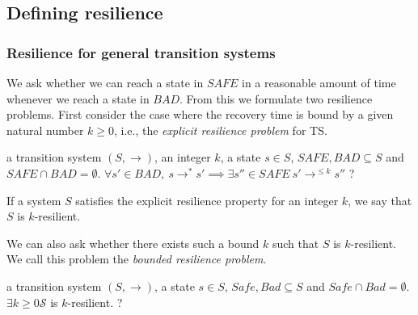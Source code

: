 
\iffalse
\subsection{Defining resilience}


\subsubsection{Resilience for general transition systems}


We ask whether we can reach a state 
in 
%
$SAFE$  in a reasonable amount of time whenever we reach a state 
in
%
$BAD$. 
From this we formulate two resilience problems. First consider the case where the recovery time
is bound by a given natural number $k \geq 0$, i.e., the \emph{explicit resilience problem} for TS.

{a transition system $(S,\rightarrow)$, an integer $k$, a state $s \in S$, $SAFE, BAD \subseteq S$ and $SAFE \cap BAD = \emptyset$.}
{$\forall s' \in BAD, ~ s \rightarrow^* s' \implies \exists s'' \in SAFE ~ s' \rightarrow^{\leq k} s''$ ?\newline}

If a system $S$ satisfies the explicit resilience property for an integer $k$, we say that $S$ is $k$-resilient.


We can also ask whether there exists such a bound $k$ such that $S$ is $k$-resilient. We call this problem the \emph{bounded resilience problem}.

%
%


{a transition system $(S,\rightarrow)$, a state $s \in S$, $Safe, Bad \subseteq S$ and $Safe \cap Bad = \emptyset$.}
{$\exists k \geq 0  \mathscr{S}$ is $k$-resilient. ?\newline}

